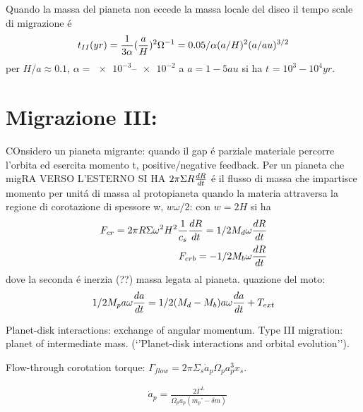 Quando la massa del pianeta non eccede la massa locale del disco il tempo scale di migrazione \'e
\begin{equation}
t_{II}(yr)=\frac{1}{3\alpha}(\frac{a}{H})^2\Omega\expy{-1}=0.05/\alpha(a/H)^2(a/au)\expy{3/2}
\end{equation}
per $H/a\approx0.1$, $\alpha=\numrange{e-3}{e-2}$ a $a=1-5 au$ si ha $t_{}=10^3-10^4yr$.


\section{Migrazione III:}

\begin{workout}
COnsidero un pianeta migrante: quando il gap \'e parziale materiale percorre l'orbita ed esercita momento t, positive/negative feedback.
Per un pianeta che migRA VERSO L'ESTERNO SI HA
$2\pi\Sigma R\TDy{t}{R}$ \'e il flusso di massa che impartisce momento per unit\'a di massa al protopianeta quando la materia attraversa la regione di corotazione di spessore w, $w\omega/2$: con $w=2H$ si ha
\begin{align}
F_{cr}=2\pi R\Sigma\omega^2 H^2\frac{1}{c_s}\TDy{t}{R}=1/2M_d\omega\TDy{t}{R}\\
F_{crb}=-1/2M_b\omega\TDy{t}{R}
\end{align}
dove la seconda \'e inerzia (??) massa legata al pianeta.
quazione del moto:
\begin{equation}
1/2M_pa\omega\TDy{t}{a}=1/2(M_d-M_b)a\omega\TDy{t}{a}+T_{ext}
\end{equation}
\end{workout}

Planet-disk interactions: exchange of angular momentum. Type III migration: planet of intermediate mass. (‘’Planet-disk interactions and orbital evolution’’).

Flow-through corotation torque: $\Gamma_{flow}=2\pi\Sigma_s\dot{a}_p\Omega_pa_p^3x_s$.

\begin{align*}
&\dot{a}_p=\frac{2\Gamma^L}{\Omega_pa_p(m_p’-\delta m)}
\end{align*}

